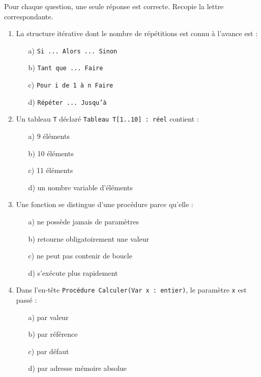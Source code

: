 \documentclass[11pt]{article}
\begin{document}
\begin{exercice}
Pour chaque question, une seule réponse est correcte. Recopie la lettre correspondante.
\begin{enumerate}
  \item La structure itérative dont le nombre de répétitions est connu à l'avance est :
  \begin{enumerate}
    \item[a)] \texttt{Si ... Alors ... Sinon}
    \item[b)] \texttt{Tant que ... Faire}
    \item[c)] \texttt{Pour i de 1 à n Faire}
    \item[d)] \texttt{Répéter ... Jusqu'à}
  \end{enumerate}
  \item Un tableau \texttt{T} déclaré \texttt{Tableau T[1..10] : réel} contient :
  \begin{enumerate}
    \item[a)] 9 éléments \item[b)] 10 éléments \item[c)] 11 éléments \item[d)] un nombre variable d'éléments
  \end{enumerate}
  \item Une fonction se distingue d'une procédure parce qu'elle :
  \begin{enumerate}
    \item[a)] ne possède jamais de paramètres
    \item[b)] retourne obligatoirement une valeur
    \item[c)] ne peut pas contenir de boucle
    \item[d)] s'exécute plus rapidement
  \end{enumerate}
  \item Dans l'en-tête \texttt{Procédure Calculer(Var x : entier)}, le paramètre \texttt{x} est passé :
  \begin{enumerate}
    \item[a)] par valeur \item[b)] par référence \item[c)] par défaut \item[d)] par adresse mémoire absolue
  \end{enumerate}
\end{enumerate}
\end{exercice}
\end{document}
